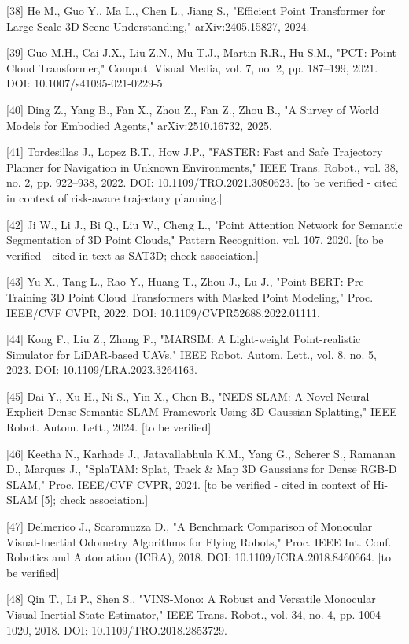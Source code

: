 \documentclass[
]{article}
\begin{document}
{[}38{]} He M., Guo Y., Ma L., Chen L., Jiang S., "Efficient Point
Transformer for Large-Scale 3D Scene Understanding," arXiv:2405.15827,
2024.

{[}39{]} Guo M.H., Cai J.X., Liu Z.N., Mu T.J., Martin R.R., Hu S.M.,
"PCT: Point Cloud Transformer," Comput. Visual Media, vol. 7, no. 2, pp.
187--199, 2021. DOI: 10.1007/s41095-021-0229-5.

{[}40{]} Ding Z., Yang B., Fan X., Zhou Z., Fan Z., Zhou B., "A Survey
of World Models for Embodied Agents," arXiv:2510.16732, 2025.

{[}41{]} Tordesillas J., Lopez B.T., How J.P., "FASTER: Fast and Safe
Trajectory Planner for Navigation in Unknown Environments," IEEE Trans.
Robot., vol. 38, no. 2, pp. 922--938, 2022. DOI:
10.1109/TRO.2021.3080623. {[}to be verified - cited in context of
risk-aware trajectory planning.{]}

{[}42{]} Ji W., Li J., Bi Q., Liu W., Cheng L., "Point Attention Network
for Semantic Segmentation of 3D Point Clouds," Pattern Recognition, vol.
107, 2020. {[}to be verified - cited in text as SAT3D; check
association.{]}

{[}43{]} Yu X., Tang L., Rao Y., Huang T., Zhou J., Lu J., "Point-BERT:
Pre-Training 3D Point Cloud Transformers with Masked Point Modeling,"
Proc. IEEE/CVF CVPR, 2022. DOI: 10.1109/CVPR52688.2022.01111.

{[}44{]} Kong F., Liu Z., Zhang F., "MARSIM: A Light-weight
Point-realistic Simulator for LiDAR-based UAVs," IEEE Robot. Autom.
Lett., vol. 8, no. 5, 2023. DOI: 10.1109/LRA.2023.3264163.

{[}45{]} Dai Y., Xu H., Ni S., Yin X., Chen B., "NEDS-SLAM: A Novel
Neural Explicit Dense Semantic SLAM Framework Using 3D Gaussian
Splatting," IEEE Robot. Autom. Lett., 2024. {[}to be verified{]}

{[}46{]} Keetha N., Karhade J., Jatavallabhula K.M., Yang G., Scherer
S., Ramanan D., Marques J., "SplaTAM: Splat, Track \& Map 3D Gaussians
for Dense RGB-D SLAM," Proc. IEEE/CVF CVPR, 2024. {[}to be verified -
cited in context of Hi-SLAM {[}5{]}; check association.{]}

{[}47{]} Delmerico J., Scaramuzza D., "A Benchmark Comparison of
Monocular Visual-Inertial Odometry Algorithms for Flying Robots," Proc.
IEEE Int. Conf. Robotics and Automation (ICRA), 2018. DOI:
10.1109/ICRA.2018.8460664. {[}to be verified{]}

{[}48{]} Qin T., Li P., Shen S., "VINS-Mono: A Robust and Versatile
Monocular Visual-Inertial State Estimator," IEEE Trans. Robot., vol. 34,
no. 4, pp. 1004--1020, 2018. DOI: 10.1109/TRO.2018.2853729.
\end{document}
